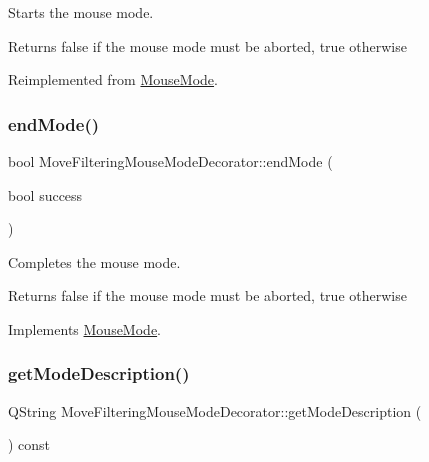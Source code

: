 Starts the mouse mode. 

\begin{DoxyReturn}{Returns}
false if the mouse mode must be aborted, true otherwise 
\end{DoxyReturn}


Reimplemented from \mbox{\hyperlink{class_mouse_mode_a32f232953a46467d2fe636df8907bd74}{Mouse\+Mode}}.

\mbox{\label{class_move_filtering_mouse_mode_decorator_a3986dc8532f8e483444c875d5e050c3b}} 
\subsubsection{\texorpdfstring{endMode()}{endMode()}}
{\footnotesize\ttfamily bool Move\+Filtering\+Mouse\+Mode\+Decorator\+::end\+Mode (\begin{DoxyParamCaption}\item[{bool}]{success }\end{DoxyParamCaption})\hspace{0.3cm}{\ttfamily [virtual]}}



Completes the mouse mode. 

\begin{DoxyReturn}{Returns}
false if the mouse mode must be aborted, true otherwise 
\end{DoxyReturn}


Implements \mbox{\hyperlink{class_mouse_mode_ad88ebf649b48364a343c86c14513039e}{Mouse\+Mode}}.

\mbox{\label{class_move_filtering_mouse_mode_decorator_ae66c9e6988302358b19aa7c8259edbdd}} 
\subsubsection{\texorpdfstring{getModeDescription()}{getModeDescription()}}
{\footnotesize\ttfamily Q\+String Move\+Filtering\+Mouse\+Mode\+Decorator\+::get\+Mode\+Description (\begin{DoxyParamCaption}{ }\end{DoxyParamCaption}) const\hspace{0.3cm}{\ttfamily [virtual]}}



